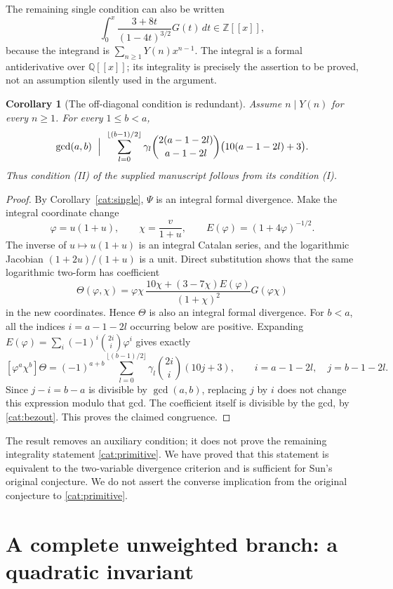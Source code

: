 \documentclass[11pt,a4paper]{article}
\newtheorem{corollary}[theorem]{Corollary}
\theoremstyle{remark}\newtheorem{remark}[theorem]{Remark}
\newcommand{\Z}{\mathbb Z}
\newcommand{\Q}{\mathbb Q}
\begin{document}
The remaining single condition can also be written
\begin{equation}\label{cat:primitive}
 \int_0^x\frac{3+8t}{(1-4t)^{3/2}}G(t)\,dt\in\Z[[x]],
\end{equation}
because the integrand is \(\sum_{n\ge1}Y(n)x^{n-1}\). The integral is a
formal antiderivative over \(\Q[[x]]\); its integrality is precisely the
assertion to be proved, not an assumption silently used in the argument.

\begin{corollary}[The off-diagonal condition is redundant]\label{cat:redundant}
Assume \(n\mid Y(n)\) for every \(n\ge1\). For every \(1\le b<a\),
\[
 \gcd(a,b)\ \Bigm|\
 \sum_{l=0}^{\lfloor(b-1)/2\rfloor}
 \gamma_l\binom{2(a-1-2l)}{a-1-2l}
                  \bigl(10(a-1-2l)+3\bigr).
\]
Thus condition (II) of the supplied manuscript follows from its
condition (I).
\end{corollary}
\begin{proof}
By Corollary~\ref{cat:single}, \(\Psi\) is an integral formal divergence.
Make the integral coordinate change
\[
 \varphi=u(1+u),\qquad \chi=\frac{v}{1+u},\qquad
 E(\varphi)=(1+4\varphi)^{-1/2}.
\]
The inverse of \(u\mapsto u(1+u)\) is an integral Catalan series,
and the logarithmic Jacobian \((1+2u)/(1+u)\) is a unit.
Direct substitution shows that the same logarithmic two-form has
coefficient
\[
 \Theta(\varphi,\chi)=
 \varphi\chi\,
 \frac{10\chi+(3-7\chi)E(\varphi)}{(1+\chi)^2}
 G(\varphi\chi)
\]
in the new coordinates. Hence \(\Theta\) is also an integral formal
divergence. For \(b<a\), all the indices \(i=a-1-2l\) occurring below
are positive. Expanding
\(E(\varphi)=\sum_i(-1)^i\binom{2i}{i}\varphi^i\) gives exactly
\[
 [\varphi^a\chi^b]\Theta
 =(-1)^{a+b}\sum_{l=0}^{\lfloor(b-1)/2\rfloor}
       \gamma_l\binom{2i}{i}(10j+3),
 \qquad i=a-1-2l,\quad j=b-1-2l.
\]
Since \(j-i=b-a\) is divisible by \(\gcd(a,b)\), replacing \(j\) by
\(i\) does not change this expression modulo that gcd. The coefficient
itself is divisible by the gcd, by \eqref{cat:bezout}. This proves the
claimed congruence.
\end{proof}

The result removes an auxiliary condition; it does not prove the
remaining integrality statement \eqref{cat:primitive}. We have proved
that this statement is equivalent to the two-variable divergence
criterion and is sufficient for Sun's original conjecture. We do not
assert the converse implication from the original conjecture to
\eqref{cat:primitive}.
\section{A complete unweighted branch: a quadratic invariant}\label{zeroliftsec}
\end{document}
